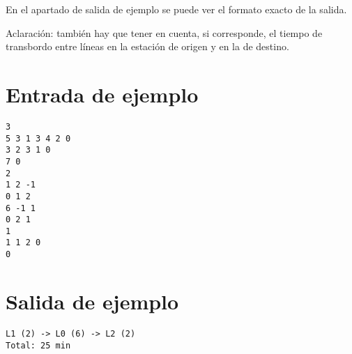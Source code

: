 \documentclass[a4paper]{article}
\begin{document}
En el apartado de salida de ejemplo se puede ver el formato exacto de la salida.

\medskip

Aclaración: también hay que tener en cuenta, si corresponde, el tiempo de transbordo entre líneas en la estación de origen y en la de destino.

\section*{Entrada de ejemplo}

\begin{verbatim}
3
5 3 1 3 4 2 0
3 2 3 1 0
7 0
2
1 2 -1
0 1 2
6 -1 1
0 2 1
1
1 1 2 0
0
\end{verbatim}

\section*{Salida de ejemplo}

\begin{verbatim}
L1 (2) -> L0 (6) -> L2 (2)
Total: 25 min
\end{verbatim}
\end{document}
